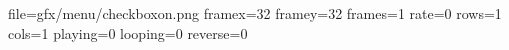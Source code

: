 file=gfx/menu/checkboxon.png
framex=32
framey=32
frames=1
rate=0
rows=1
cols=1
playing=0
looping=0
reverse=0
